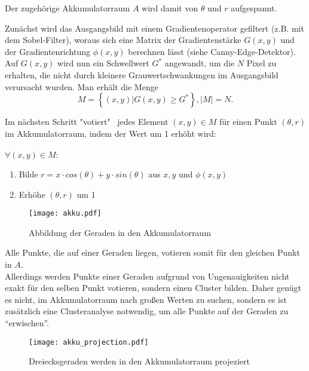 Der zugehörige Akkumulatorraum $A$ wird damit von $\theta$ und $r$ aufgespannt.

Zunächst wird das Ausgangsbild mit einem Gradientenoperator gefiltert (z.B. mit dem Sobel-Filter), woraus sich eine Matrix der Gradientenstärke $G(x, y)$ und der Gradientenrichtung $\phi (x, y)$ berechnen lässt (siehe Canny-Edge-Detektor). \\
Auf $G(x, y)$ wird nun ein Schwellwert $G^*$ angewandt, um die $N$ Pixel zu erhalten, die nicht durch kleinere Grauwertschwankungen im Ausgangsbild verursacht wurden.  Man erhält die Menge
\begin{equation*}
M = \left \{ (x, y) | G(x, y) \geq G^*\right \}, |M|=N.
\end{equation*}

Im nächsten Schritt "votiert" \, jedes Element $(x, y) \in M$ für einen Punkt $(\theta, r)$ im Akkumulatorraum, indem der Wert um 1 erhöht wird: \\\\
 $\forall (x, y) \in M:$
\begin{enumerate}
\item Bilde $r = x \cdot cos (\theta) + y \cdot sin (\theta)$ aus $x,y$ und $\phi (x,y)$
\item Erhöhe $(\theta, r)$ um 1
\end{enumerate}

\begin{figure}[H]
  \begin{center}
    \texttt{[image: akku.pdf]}
    \caption{Abbildung der Geraden in den Akkumulatorraum}
    \label{fig:akku}
  \end{center}
\end{figure}

Alle Punkte, die auf einer Geraden liegen, votieren somit für den gleichen Punkt in $A$. \\ 
Allerdings werden Punkte einer Geraden aufgrund von Ungenauigkeiten nicht exakt für den selben Punkt votieren, sondern einen Cluster bilden. Daher genügt es nicht, im Akkumulatorraum nach großen Werten zu suchen, sondern es ist zusätzlich eine Clusteranalyse notwendig, um alle Punkte auf der Geraden zu "`erwischen"'.
\begin{figure}[H]
  \begin{center}
    \texttt{[image: akku\_projection.pdf]}
    \caption{Dreiecksgeraden werden in den Akkumulatorraum projeziert}
    \label{fig:akku_projection}
  \end{center}
\end{figure}
 

